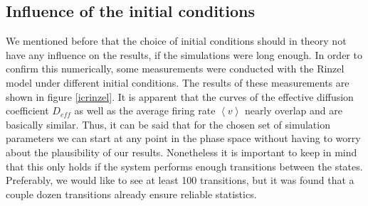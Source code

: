 \documentclass[12pt,a4paper]{article}
\begin{document}
\subsection{Influence of the initial conditions}
We mentioned before that the choice of initial conditions should in theory not have any influence on the results, if the simulations were long enough. In order to confirm this numerically, some measurements were conducted with the Rinzel model under different initial conditions. The results of these measurements are shown in figure \ref{icrinzel}. It is apparent that the curves of the effective diffusion coefficient $D_{eff}$ as well as the average firing rate $\left<v\right>$ nearly overlap and are basically similar. Thus, it can be said that for the chosen set of simulation parameters we can start at any point in the phase space without having to worry about the plausibility of our results. Nonetheless it is important to keep in mind that this only holds if the system performs enough transitions between the states. Preferably, we would like to see at least 100 transitions, but it was found that a couple dozen transitions already ensure reliable statistics.
\end{document}
